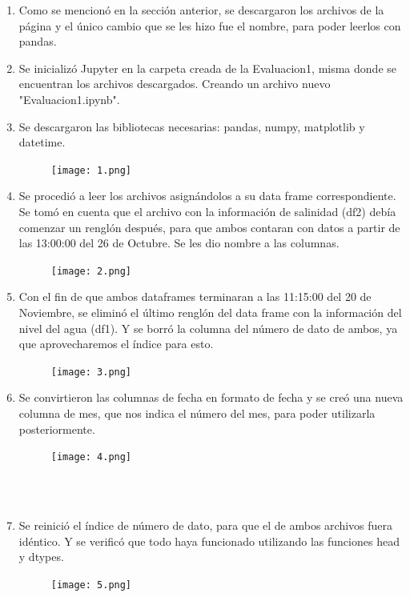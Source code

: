 \documentclass[12pt]{article}
\begin{document}
\begin{enumerate}
\item Como se mencionó en la sección anterior, se descargaron los archivos de la página y el único cambio que se les hizo fue el nombre, para poder leerlos con pandas. 
\item Se inicializó Jupyter en la carpeta creada de la Evaluacion1, misma donde se encuentran los archivos descargados. Creando un archivo nuevo "Evaluacion1.ipynb". 
\item Se descargaron las bibliotecas necesarias: pandas, numpy, matplotlib y datetime. 
\begin{figure}[h!]
  \texttt{[image: 1.png]}
  \centering
  \label{fig:1}
\end{figure}

\item Se procedió a leer los archivos asignándolos a su data frame correspondiente. Se tomó en cuenta que el archivo con la información de salinidad (df2) debía comenzar un renglón después, para que ambos contaran con datos a partir de las 13:00:00 del 26 de Octubre. Se les dio nombre a las columnas.
\begin{figure}[h!]
  \texttt{[image: 2.png]}
  \centering
  \label{fig:2}
\end{figure}
\item Con el fin de que ambos dataframes terminaran a las 11:15:00 del 20 de Noviembre, se eliminó el último renglón del data frame con la información del nivel del agua (df1). Y se borró la columna del número de dato de ambos, ya que aprovecharemos el índice para esto.
\begin{figure}[h!]
  \texttt{[image: 3.png]}
  \centering
  \label{fig:3}
\end{figure}
\item Se convirtieron las columnas de fecha en formato de fecha y se creó una nueva columna de mes, que nos indica el número del mes, para poder utilizarla posteriormente. 
\begin{figure}[h!]
  \texttt{[image: 4.png]}
  \centering
  \label{fig:4}
\end{figure}\\
\\
\item Se reinició el índice de número de dato, para que el de ambos archivos fuera idéntico. Y se verificó que todo haya funcionado utilizando las funciones head y dtypes.
\begin{figure}[h!]
  \texttt{[image: 5.png]}
  \centering
  \label{fig:5}
\end{figure}

\end{enumerate}
\end{document}
